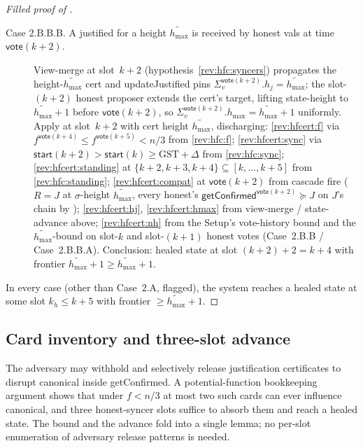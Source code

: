 \ifx\litemode\undefined\documentclass{article}\fi
\newcommand{\hmax}{\ensuremath{h_{\max}}\xspace}
\newcommand{\start}{\ensuremath{\mathsf{start}}}
\newcommand{\vote}{\ensuremath{\mathsf{vote}}}
\newcommand{\GST}{\ensuremath{\mathrm{GST}}\xspace}
\newcommand{\comm}[1]{\ensuremath{\widetilde{#1}}}
\newcommand{\updateJustified}{\textsf{updateJustified}\xspace}
\newcommand{\getConfirmed}{\textsf{getConfirmed}\xspace}
\theoremstyle{plain}
\theoremstyle{definition}
\theoremstyle{remark}
\begin{document}
\begin{proof}[Filled proof of ]
\begin{description}[style=nextline]
\begin{description}[style=nextline]
\begin{description}[style=nextline]
\begin{description}
          \item[Case 2.B.B.B. A justified for a height $\comm{\hmax}$ is received by honest vals at time $\vote(k+2)$.]
            View-merge at slot~$k+2$ (hypothesis~\ref{rev:hfc:syncers}) propagates the height-$\comm{\hmax}$ cert and \updateJustified{} pins $\Sigma_v^{\vote(k+2)}.h_j = \comm{\hmax}$;
            the slot-$(k+2)$ honest proposer extends the cert's target, lifting state-height to $\comm{\hmax}+1$ before $\vote(k+2)$, so $\Sigma_v^{\vote(k+2)}.\hmax = \comm{\hmax}+1$ uniformly.
            Apply  at slot~$k+2$ with cert height $\comm{\hmax}$, discharging:
            \ref{rev:hfcert:f} via $f^{\vote(k+4)} \leq f^{\vote(k+5)} < n/3$ from \ref{rev:hfc:f};
            \ref{rev:hfcert:sync} via $\start(k+2) > \start(k) \geq \GST + \Delta$ from \ref{rev:hfc:sync};
            \ref{rev:hfcert:standing} at $\{k+2, k+3, k+4\} \subseteq [k,\dots,k+5]$ from \ref{rev:hfc:standing};
            \ref{rev:hfcert:compat} at $\vote(k+2)$ from cascade fire ($R = J$ at $\sigma$-height $\comm{\hmax}$, every honest's $\getConfirmed^{\vote(k+2)} \succeq J$ on $J$'s chain by );
            \ref{rev:hfcert:hj}, \ref{rev:hfcert:hmax} from view-merge / state-advance above;
            \ref{rev:hfcert:nh} from the Setup's vote-history bound and the $\comm{\hmax}$-bound on slot-$k$ and slot-$(k+1)$ honest votes (Case~2.B.B / Case~2.B.B.A).
            Conclusion: healed state at slot $(k+2)+2 = k+4$ with frontier $\comm{\hmax}+1 \geq \comm{\hmax}+1$.
        \end{description}
    \end{description}
  \end{description}
\end{description}

In every case (other than Case~2.A, flagged), the system reaches a healed state at some slot $k_h \leq k+5$ with frontier $\geq \comm{\hmax}+1$.
\end{proof}

\subsection{Card inventory and three-slot advance}\label{sec:card-and-advance}

The adversary may withhold and selectively release justification certificates to disrupt canonical inside \getConfirmed{}.
A potential-function bookkeeping argument shows that under $f < n/3$ at most two such cards can ever influence canonical, and three honest-syncer slots suffice to absorb them and reach a healed state.
The bound and the advance fold into a single lemma; no per-slot enumeration of adversary release patterns is needed.
\end{document}
